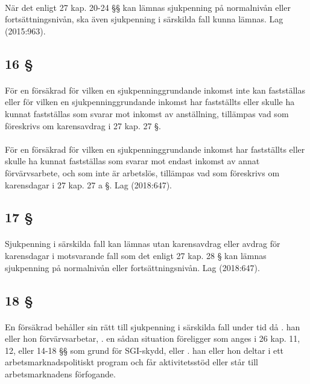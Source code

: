 \documentclass[a4paper,notitlepage,openany,10pt]{book}
\begin{document}
\paragraph*{}
När det enligt 27 kap. 20-24 §§ kan lämnas sjukpenning på normalnivån eller fortsättningsnivån, ska även sjukpenning i särskilda fall kunna lämnas.
Lag (2015:963).
\subsection*{16 §}
\paragraph*{}
För en försäkrad för vilken en sjukpenninggrundande inkomst inte kan fastställas eller för vilken en sjukpenninggrundande inkomst har fastställts eller skulle ha kunnat fastställas som svarar mot inkomst av anställning, tillämpas vad som föreskrivs om karensavdrag i 27 kap. 27 §.
\paragraph*{}
För en försäkrad för vilken en sjukpenninggrundande inkomst har fastställts eller skulle ha kunnat fastställas som svarar mot endast inkomst av annat förvärvsarbete, och som inte är arbetslös, tillämpas vad som föreskrivs om karensdagar i 27 kap. 27 a §.
Lag (2018:647).
\subsection*{17 §}
\paragraph*{}
Sjukpenning i särskilda fall kan lämnas utan karensavdrag eller avdrag för karensdagar i motsvarande fall som det enligt 27 kap. 28 § kan lämnas sjukpenning på normalnivån eller fortsättningsnivån.
Lag (2018:647).
\subsection*{18 §}
\paragraph*{}
En försäkrad behåller sin rätt till sjukpenning i särskilda fall under tid då
. han eller hon förvärvsarbetar,
. en sådan situation föreligger som anges i 26 kap. 11, 12, eller 14-18 §§ som grund för SGI-skydd, eller
. han eller hon deltar i ett arbetsmarknadspolitiskt program och får aktivitetsstöd eller står till arbetsmarknadens förfogande.
\end{document}
